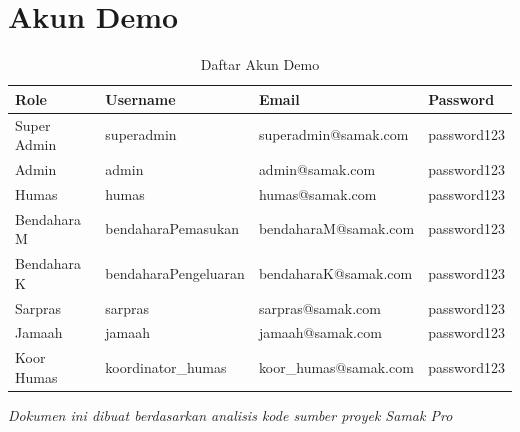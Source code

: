\documentclass[12pt,a4paper]{article}
\begin{document}
\section{Akun Demo}
\begin{table}[h]
\centering
\begin{tabular}{|l|l|l|l|}
\hline
\textbf{Role} & \textbf{Username} & \textbf{Email} & \textbf{Password} \\
\hline
Super Admin & superadmin & superadmin@samak.com & password123 \\
Admin & admin & admin@samak.com & password123 \\
Humas & humas & humas@samak.com & password123 \\
Bendahara M & bendaharaPemasukan & bendaharaM@samak.com & password123 \\
Bendahara K & bendaharaPengeluaran & bendaharaK@samak.com & password123 \\
Sarpras & sarpras & sarpras@samak.com & password123 \\
Jamaah & jamaah & jamaah@samak.com & password123 \\
Koor Humas & koordinator\_humas & koor\_humas@samak.com & password123 \\
\hline
\end{tabular}
\caption{Daftar Akun Demo}
\end{table}

\vfill
\begin{center}
\textit{Dokumen ini dibuat berdasarkan analisis kode sumber proyek Samak Pro}
\end{center}
\end{document}
